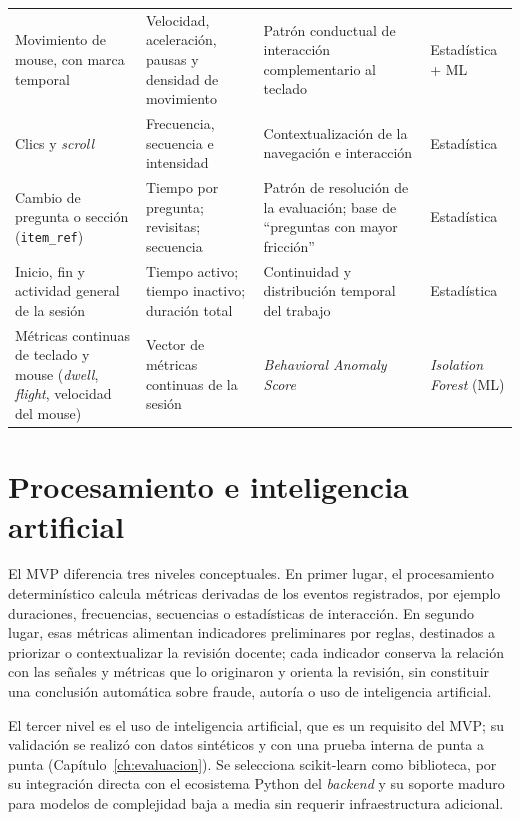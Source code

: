 \begin{table}[htbp]
\begin{tabularx}{\textwidth}{>{\raggedright\arraybackslash}p{3.1cm} >{\raggedright\arraybackslash}p{3.1cm} >{\raggedright\arraybackslash}X >{\raggedright\arraybackslash}p{1.9cm}}
        Movimiento de mouse, con marca temporal & Velocidad, aceleración, pausas y densidad de movimiento & Patrón conductual de interacción complementario al teclado & Estadística + ML \\
        Clics y \textit{scroll} & Frecuencia, secuencia e intensidad & Contextualización de la navegación e interacción & Estadística \\
        Cambio de pregunta o sección (\texttt{item\_ref}) & Tiempo por pregunta; revisitas; secuencia & Patrón de resolución de la evaluación; base de ``preguntas con mayor fricción'' & Estadística \\
        Inicio, fin y actividad general de la sesión & Tiempo activo; tiempo inactivo; duración total & Continuidad y distribución temporal del trabajo & Estadística \\
        Métricas continuas de teclado y mouse (\textit{dwell}, \textit{flight}, velocidad del mouse) & Vector de métricas continuas de la sesión & \textit{Behavioral Anomaly Score} & \textit{Isolation Forest} (ML) \\
        \bottomrule
    \end{tabularx}
\end{table}

\section{Procesamiento e inteligencia artificial}
\label{sec:procesamiento_ia}

El MVP diferencia tres niveles conceptuales. En primer lugar, el procesamiento determinístico calcula métricas derivadas de los eventos registrados, por ejemplo duraciones, frecuencias, secuencias o estadísticas de interacción. En segundo lugar, esas métricas alimentan indicadores preliminares por reglas, destinados a priorizar o contextualizar la revisión docente; cada indicador conserva la relación con las señales y métricas que lo originaron y orienta la revisión, sin constituir una conclusión automática sobre fraude, autoría o uso de inteligencia artificial.

El tercer nivel es el uso de inteligencia artificial, que es un requisito del MVP; su validación se realizó con datos sintéticos y con una prueba interna de punta a punta (Capítulo~\ref{ch:evaluacion}). Se selecciona scikit-learn \parencite{Pedregosa2011} como biblioteca, por su integración directa con el ecosistema Python del \textit{backend} y su soporte maduro para modelos de complejidad baja a media sin requerir infraestructura adicional.

